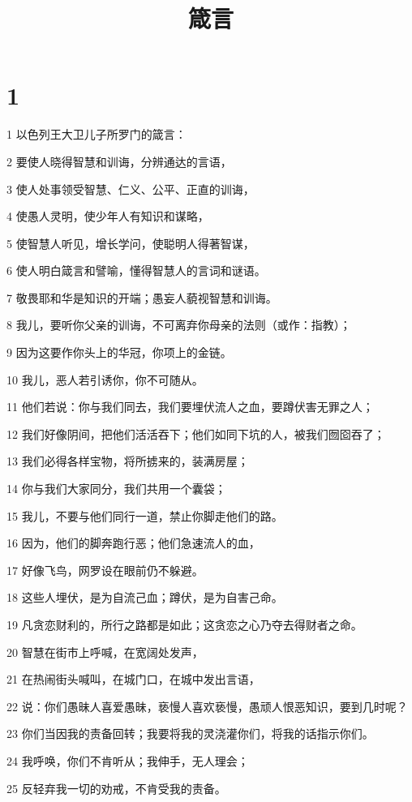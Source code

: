 

\title{箴言}


\chapter{1}

\par 1 以色列王大卫儿子所罗门的箴言：
\par 2 要使人晓得智慧和训诲，分辨通达的言语，
\par 3 使人处事领受智慧、仁义、公平、正直的训诲，
\par 4 使愚人灵明，使少年人有知识和谋略，
\par 5 使智慧人听见，增长学问，使聪明人得著智谋，
\par 6 使人明白箴言和譬喻，懂得智慧人的言词和谜语。
\par 7 敬畏耶和华是知识的开端；愚妄人藐视智慧和训诲。
\par 8 我儿，要听你父亲的训诲，不可离弃你母亲的法则（或作：指教）；
\par 9 因为这要作你头上的华冠，你项上的金链。
\par 10 我儿，恶人若引诱你，你不可随从。
\par 11 他们若说：你与我们同去，我们要埋伏流人之血，要蹲伏害无罪之人；
\par 12 我们好像阴间，把他们活活吞下；他们如同下坑的人，被我们囫囵吞了；
\par 13 我们必得各样宝物，将所掳来的，装满房屋；
\par 14 你与我们大家同分，我们共用一个囊袋；
\par 15 我儿，不要与他们同行一道，禁止你脚走他们的路。
\par 16 因为，他们的脚奔跑行恶；他们急速流人的血，
\par 17 好像飞鸟，网罗设在眼前仍不躲避。
\par 18 这些人埋伏，是为自流己血；蹲伏，是为自害己命。
\par 19 凡贪恋财利的，所行之路都是如此；这贪恋之心乃夺去得财者之命。
\par 20 智慧在街市上呼喊，在宽阔处发声，
\par 21 在热闹街头喊叫，在城门口，在城中发出言语，
\par 22 说：你们愚昧人喜爱愚昧，亵慢人喜欢亵慢，愚顽人恨恶知识，要到几时呢？
\par 23 你们当因我的责备回转；我要将我的灵浇灌你们，将我的话指示你们。
\par 24 我呼唤，你们不肯听从；我伸手，无人理会；
\par 25 反轻弃我一切的劝戒，不肯受我的责备。
